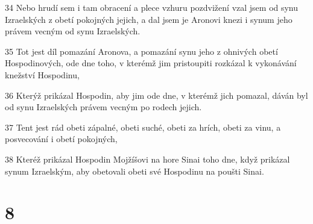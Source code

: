 \par 34 Nebo hrudí sem i tam obracení a plece vzhuru pozdvižení vzal jsem od synu Izraelských z obetí pokojných jejich, a dal jsem je Aronovi knezi i synum jeho právem vecným od synu Izraelských.
\par 35 Tot jest díl pomazání Aronova, a pomazání synu jeho z ohnivých obetí Hospodinových, ode dne toho, v kterémž jim pristoupiti rozkázal k vykonávání knežství Hospodinu,
\par 36 Kterýž prikázal Hospodin, aby jim ode dne, v kterémž jich pomazal, dáván byl od synu Izraelských právem vecným po rodech jejich.
\par 37 Tent jest rád obeti zápalné, obeti suché, obeti za hrích, obeti za vinu, a posvecování i obetí pokojných,
\par 38 Kteréž prikázal Hospodin Mojžíšovi na hore Sinai toho dne, když prikázal synum Izraelským, aby obetovali obeti své Hospodinu na poušti Sinai.

\chapter{8}

